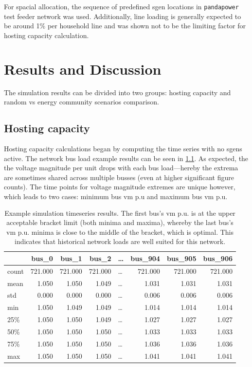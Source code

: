 \documentclass[a4paper,10pt]{report}
\begin{document}
For spacial allocation, the sequence of predefined sgen locations in \texttt{pandapower} test feeder network was used. Additionally, line loading is generally expected to be around 1\% per household line and was shown not to be the limiting factor for hosting capacity calculation.


\chapter{Results and Discussion}
The simulation results can be divided into two groups: hosting capacity and random vs energy community scenarios comparison.

\section{Hosting capacity}
Hosting capacity calculations began by computing the time series with no sgens active. The network bus load example results can be seen in \cref{hosting_time_series_table}. As expected, the the voltage magnitude per unit drops with each bus load---hereby the extrema are sometimes shared across multiple busses (even at higher significant figure counts). The time points for voltage magnitude extremes are unique however, which leads to two cases: minimum bus vm p.u and maximum bus vm p.u.

\begin{table}[htpb]
	\centering
	\begin{tabular}{lrrrlrrr}
		\toprule
		& bus\_0 & bus\_1 & bus\_2 & \dots & bus\_904 & bus\_905 & bus\_906 \\
		\midrule
		count & 721.000 & 721.000 & 721.000 & \dots & 721.000 & 721.000 & 721.000 \\
		mean & 1.050 & 1.050 & 1.049 & \dots & 1.031 & 1.031 & 1.031 \\
		std & 0.000 & 0.000 & 0.000 & \dots & 0.006 & 0.006 & 0.006 \\
		min & 1.050 & 1.049 & 1.049 & \dots & 1.014 & 1.014 & 1.014 \\
		25\% & 1.050 & 1.050 & 1.049 & \dots & 1.027 & 1.027 & 1.027 \\
		50\% & 1.050 & 1.050 & 1.050 & \dots & 1.033 & 1.033 & 1.033 \\
		75\% & 1.050 & 1.050 & 1.050 & \dots & 1.036 & 1.036 & 1.036 \\
		max & 1.050 & 1.050 & 1.050 & \dots & 1.041 & 1.041 & 1.041 \\
		\bottomrule
	\end{tabular}
	\caption[Example simulation timeseries results]{Example simulation timeseries results. The first bus's vm p.u. is at the upper acceptable bracket limit (both minima and maxima), whereby the last bus's vm p.u. minima is close to the middle of the bracket, which is optimal. This indicates that historical network loads are well suited for this network.}
	\label{hosting_time_series_table}
\end{table}
\end{document}
